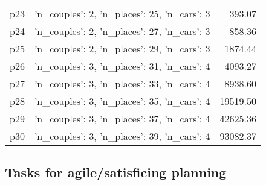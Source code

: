 \documentclass{article}
\begin{document}
\begin{center}
\begin{tabular}{@{}l|r|r@{}}
  p23&{'n\_couples': 2, 'n\_places': 25, 'n\_cars': 3}&393.07\\
  p24&{'n\_couples': 2, 'n\_places': 27, 'n\_cars': 3}&858.36\\
  p25&{'n\_couples': 2, 'n\_places': 29, 'n\_cars': 3}&1874.44\\
  p26&{'n\_couples': 3, 'n\_places': 31, 'n\_cars': 4}&4093.27\\
  p27&{'n\_couples': 3, 'n\_places': 33, 'n\_cars': 4}&8938.60\\
  p28&{'n\_couples': 3, 'n\_places': 35, 'n\_cars': 4}&19519.50\\
  p29&{'n\_couples': 3, 'n\_places': 37, 'n\_cars': 4}&42625.36\\
  p30&{'n\_couples': 3, 'n\_places': 39, 'n\_cars': 4}&93082.37
                            \end{tabular}
                            \end{center}
                    

                                \subsection*{Tasks for agile/satisficing planning}
                                
\end{document}
